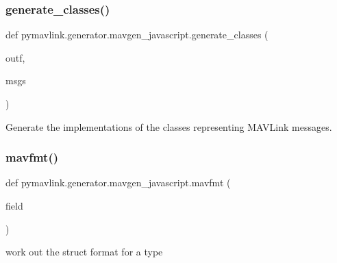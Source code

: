 \subsubsection{\texorpdfstring{generate\+\_\+classes()}{generate\_classes()}}
{\footnotesize\ttfamily def pymavlink.\+generator.\+mavgen\+\_\+javascript.\+generate\+\_\+classes (\begin{DoxyParamCaption}\item[{}]{outf,  }\item[{}]{msgs }\end{DoxyParamCaption})}

\begin{DoxyVerb}Generate the implementations of the classes representing MAVLink messages.\end{DoxyVerb}
 \mbox{\label{namespacepymavlink_1_1generator_1_1mavgen__javascript_a5193d9a9ee0c09b4d88d2b34381d81fe}} 
\subsubsection{\texorpdfstring{mavfmt()}{mavfmt()}}
{\footnotesize\ttfamily def pymavlink.\+generator.\+mavgen\+\_\+javascript.\+mavfmt (\begin{DoxyParamCaption}\item[{}]{field }\end{DoxyParamCaption})}

\begin{DoxyVerb}work out the struct format for a type\end{DoxyVerb}
 